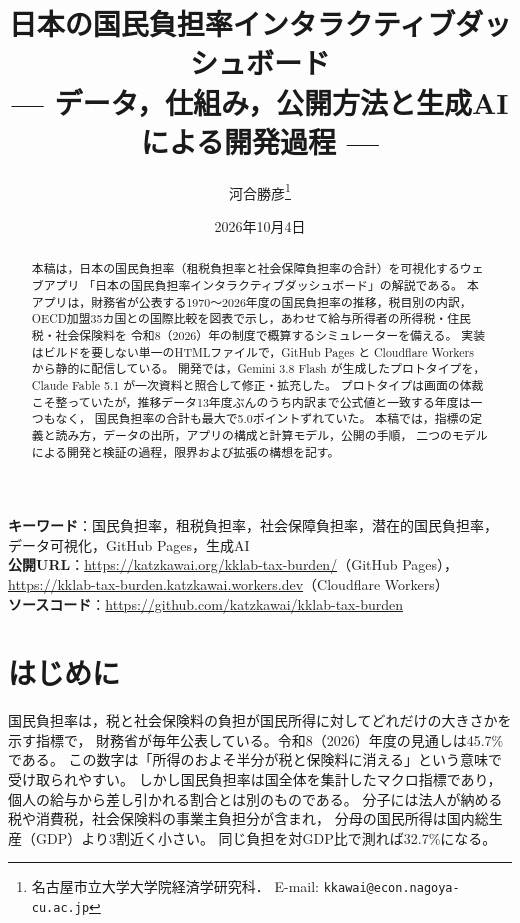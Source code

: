 \documentclass[paper=a4,fontsize=10pt]{jlreq}
\title{日本の国民負担率インタラクティブダッシュボード\\
  --- データ，仕組み，公開方法と生成AIによる開発過程 ---}
\author{河合勝彦\thanks{名古屋市立大学大学院経済学研究科．
  E-mail: \texttt{kkawai@econ.nagoya-cu.ac.jp}}}
\date{2026年10月4日}
\begin{document}
\maketitle

\begin{abstract}
本稿は，日本の国民負担率（租税負担率と社会保障負担率の合計）を可視化するウェブアプリ
「日本の国民負担率インタラクティブダッシュボード」の解説である。
本アプリは，財務省が公表する1970〜2026年度の国民負担率の推移，税目別の内訳，
OECD加盟35カ国との国際比較を図表で示し，あわせて給与所得者の所得税・住民税・社会保険料を
令和8（2026）年の制度で概算するシミュレーターを備える。
実装はビルドを要しない単一のHTMLファイルで，GitHub Pages と Cloudflare Workers から静的に配信している。
開発では，Gemini 3.8 Flash が生成したプロトタイプを，Claude Fable 5.1 が一次資料と照合して修正・拡充した。
プロトタイプは画面の体裁こそ整っていたが，推移データ13年度ぶんのうち内訳まで公式値と一致する年度は一つもなく，
国民負担率の合計も最大で5.0ポイントずれていた。
本稿では，指標の定義と読み方，データの出所，アプリの構成と計算モデル，公開の手順，
二つのモデルによる開発と検証の過程，限界および拡張の構想を記す。
\end{abstract}

\noindent
\textbf{キーワード}：国民負担率，租税負担率，社会保障負担率，潜在的国民負担率，
データ可視化，GitHub Pages，生成AI\\
\textbf{公開URL}：\url{https://katzkawai.org/kklab-tax-burden/}（GitHub Pages），
\url{https://kklab-tax-burden.katzkawai.workers.dev}（Cloudflare Workers）\\
\textbf{ソースコード}：\url{https://github.com/katzkawai/kklab-tax-burden}

\setcounter{tocdepth}{2}
\tableofcontents
\clearpage

\section{はじめに}

国民負担率は，税と社会保険料の負担が国民所得に対してどれだけの大きさかを示す指標で，
財務省が毎年公表している。令和8（2026）年度の見通しは45.7\%である\cite{mof2026}。
この数字は「所得のおよそ半分が税と保険料に消える」という意味で受け取られやすい。
しかし国民負担率は国全体を集計したマクロ指標であり，個人の給与から差し引かれる割合とは別のものである。
分子には法人が納める税や消費税，社会保険料の事業主負担分が含まれ，
分母の国民所得は国内総生産（GDP）より3割近く小さい。
同じ負担を対GDP比で測れば32.7\%になる。
\end{document}
